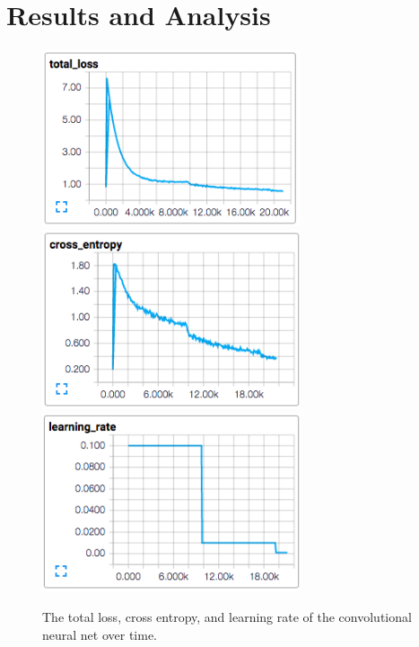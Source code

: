 \documentclass[11pt, twocolumn, twoside]{article}
\begin{document}
\section{Results and Analysis}

\begin{figure}
	\centering
	\includegraphics[width=3in]{total_loss}
	\includegraphics[width=3in]{cross_entropy}
	\includegraphics[width=3in]{learning_rate}
	\caption{The total loss, cross entropy, and learning rate of the convolutional neural net over time.}
	\label{fig:cnnloss}
\end{figure}
\end{document}

